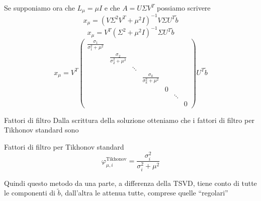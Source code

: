\documentclass{beamer}
\theoremstyle{plain}
\theoremstyle{definition}
\theoremstyle{remark}
\newcommand{\pa}[1]{\left(#1\right)}
\begin{document}
\begin{frame}
  Se supponiamo ora che $L_\mu = \mu I$ e che $A = U\Sigma V^T$
  possiamo scrivere
  \[  x_\mu = \pa{ V \Sigma ^2 V^T + \mu ^2 I }^{-1} V \Sigma U^T \tilde b  \]
  \[  x_\mu = V^T \pa{\Sigma ^2 + \mu ^2 I }^{-1} \Sigma U^T \tilde b \]
  \[  x_\mu = V^T
  \begin{pmatrix}
    \frac{\sigma _1 }{\sigma _1 ^2 + \mu ^2} \\
    & \frac{\sigma _2 }{\sigma _2 ^2 + \mu ^2} \\
    & & \ddots \\
    & & & \frac{\sigma _k }{\sigma _k ^2 + \mu ^2}\\
    & & & & 0\\
    & & & & & \ddots \\
    & & & & & & 0
  \end{pmatrix}
  U^T \tilde  b \]
\end{frame}

\begin{frame}{Fattori di filtro}
  Dalla scrittura della soluzione otteniamo che i fattori di filtro
  per Tikhonov standard sono
  \begin{block}{Fattori di filtro per Tikhonov standard}
  \[ \varphi ^{\text{Tikhonov}} _{\mu,i} = \frac{\sigma _i ^2}{\sigma _i
    ^2 + \mu ^2} \]
  \end{block}
  \vfill
  
  Quindi questo metodo da una parte, a differenza della TSVD, tiene
  conto di tutte le componenti di $\tilde b$, dall'altra le attenua
  tutte, comprese quelle ``regolari''
\end{frame}
\end{document}

